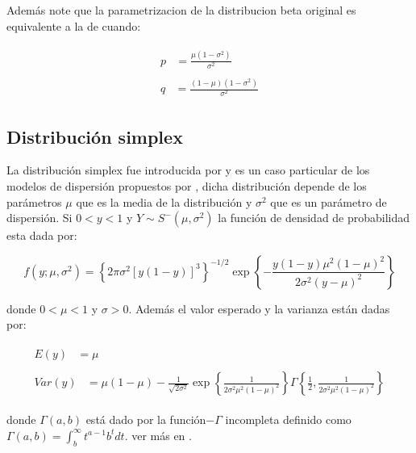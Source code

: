 Adem\'{a}s note que la parametrizacion de la distribucion beta original es equivalente a la de \cite{Stasinopoulos2} cuando:

\begin{align}
\begin{split}
	p &= \frac{\mu(1-\sigma^2)}{\sigma^2}
\end{split} \label{RS_Origin1} \\
\begin{split}
q &= \frac{(1-\mu)(1-\sigma^2)}{\sigma^2} 
\end{split} \label{RS_Origin2}
\end{align}

\subsection{Distribuci\'{o}n simplex}

La distribuci\'{o}n simplex fue introducida por \cite{Barndorff1} y es un caso particular de los modelos de dispersi\'{o}n propuestos por \cite{Jorgensen1}, dicha distribuci\'{o}n depende de los par\'{a}metros $\mu$ que es la media de la distribuci\'{o}n y $\sigma^2$ que es un par\'{a}metro de dispersi\'{o}n. Si $0<y<1$ y $Y \sim S^{-}(\mu, \sigma^2)$ la funci\'{o}n de densidad de probabilidad esta dada por:

\begin{equation}
f(y;\mu,\sigma^2)=\left\{2\pi\sigma^2[y(1-y)]^3\right\}^{-1/2}\exp\left\{-\frac{y(1-y)\mu^2(1-\mu)^2}{2\sigma^2(y-\mu)^2}\right\}
\end{equation}

donde $0<\mu<1$ y $\sigma>0$. Adem\'{a}s el valor esperado y la varianza est\'{a}n dadas por:

\begin{align}
\begin{split}
	E(y) &= \mu 
\end{split} \label{E_Simplex} \\
\begin{split}
	Var(y) &= \mu(1-\mu)-\frac{1}{\sqrt{2\sigma^2}}\exp\left\{\frac{1}{2\sigma^2\mu^2(1-\mu)^2}\right\}\Gamma\left\{\frac{1}{2},\frac{1}{2\sigma^2\mu^2(1-\mu)^2}\right\}
\end{split} \label{V_Simplex}
\end{align}

donde $\Gamma(a,b)$ est\'{a} dado por la funci\'{o}n$-\Gamma$ incompleta definido como $\Gamma(a,b)=\int_{b}^{\infty}{t^{a-1}b^tdt}$. ver m\'{a}s en \cite{Zhang1}.

